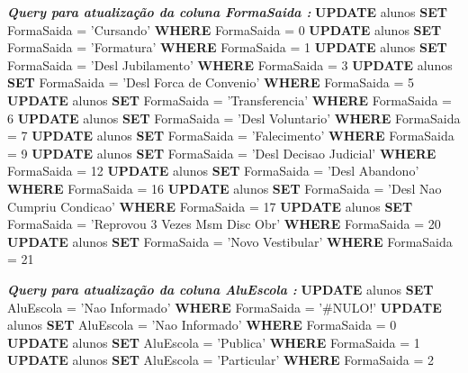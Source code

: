 \noindent \textbf{\textit{Query para atualização da coluna \textit{FormaSaida} :}} \newline
\textbf{UPDATE} alunos \textbf{SET} FormaSaida = 'Cursando' \textbf{WHERE} FormaSaida = 0 \newline
\textbf{UPDATE} alunos \textbf{SET} FormaSaida = 'Formatura' \textbf{WHERE} FormaSaida = 1 \newline
\textbf{UPDATE} alunos \textbf{SET} FormaSaida = 'Desl Jubilamento' \textbf{WHERE} FormaSaida = 3 \newline
\textbf{UPDATE} alunos \textbf{SET} FormaSaida = 'Desl Forca de Convenio' \textbf{WHERE} FormaSaida = 5 \newline
\textbf{UPDATE} alunos \textbf{SET} FormaSaida = 'Transferencia' \textbf{WHERE} FormaSaida = 6 \newline
\textbf{UPDATE} alunos \textbf{SET} FormaSaida = 'Desl Voluntario' \textbf{WHERE} FormaSaida = 7 \newline
\textbf{UPDATE} alunos \textbf{SET} FormaSaida = 'Falecimento' \textbf{WHERE} FormaSaida = 9 \newline
\textbf{UPDATE} alunos \textbf{SET} FormaSaida = 'Desl Decisao Judicial' \textbf{WHERE} FormaSaida = 12 \newline
\textbf{UPDATE} alunos \textbf{SET} FormaSaida = 'Desl Abandono' \textbf{WHERE} FormaSaida = 16 \newline
\textbf{UPDATE} alunos \textbf{SET} FormaSaida = 'Desl Nao Cumpriu Condicao' \textbf{WHERE} FormaSaida = 17 \newline
\textbf{UPDATE} alunos \textbf{SET} FormaSaida = 'Reprovou 3 Vezes Msm Disc Obr' \textbf{WHERE} FormaSaida = 20 \newline
\textbf{UPDATE} alunos \textbf{SET} FormaSaida = 'Novo Vestibular' \textbf{WHERE} FormaSaida = 21 \newline

\noindent \textbf{\textit{Query para atualização da coluna \textit{AluEscola} :}} \newline
\textbf{UPDATE} alunos \textbf{SET} AluEscola = 'Nao Informado' \textbf{WHERE} FormaSaida = '\#NULO!' \newline
\textbf{UPDATE} alunos \textbf{SET} AluEscola = 'Nao Informado' \textbf{WHERE} FormaSaida = 0 \newline
\textbf{UPDATE} alunos \textbf{SET} AluEscola = 'Publica' \textbf{WHERE} FormaSaida = 1 \newline
\textbf{UPDATE} alunos \textbf{SET} AluEscola = 'Particular' \textbf{WHERE} FormaSaida = 2 \newline

